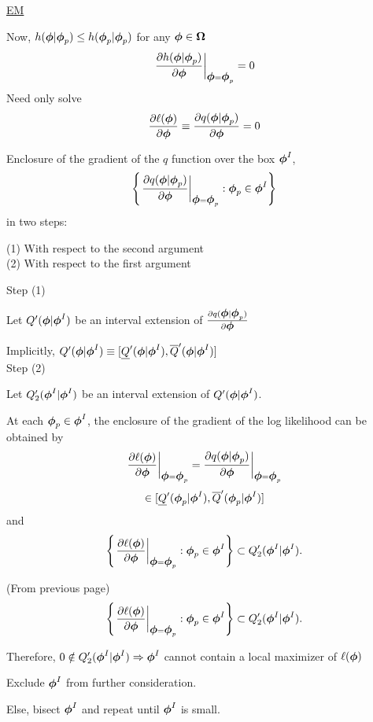 \documentclass{slides}
\begin{document}
\begin{slide}
\begin{center}\underline{EM}\end{center}
Now, $h(\bfphi | \bfphi_p) \leq h(\bfphi_p | \bfphi_p)$ for 
any $\bfphi \in \bfOmega$
$$\left.\frac{\partial h(\bfphi | \bfphi_p)}{\partial \bfphi}
  \right|_{\bfphi=\bfphi_p}=0$$
Need only solve
$$ 
\frac{\partial \ell(\bfphi)}{\partial \bfphi} \equiv 
\frac{\partial q(\bfphi | \bfphi_p)}{\partial \bfphi} = 0
$$

Enclosure of the gradient of the $q$ function over the box $\bfphi^I$,
$$
\left\{ \left.\frac{\partial q(\bfphi | \bfphi_p)}{\partial\bfphi} 
  \right|_{\bfphi=\bfphi_p} : \bfphi_p \in \bfphi^I \right\}
$$
in two steps:

(1) With respect to the second argument\\
(2) With respect to the first argument\\
\end{slide}
\begin{slide}
Step (1)

Let $Q'(\bfphi | \bfphi^I)$
be an interval extension of 
$\frac{\partial q(\bfphi|\bfphi_p)}{\partial\bfphi} $

Implicitly, $Q'(\bfphi | \bfphi^I) \equiv [\underline{Q}'(\bfphi | \bfphi^I), \overline{Q}'(\bfphi | \bfphi^I)]$\\

Step (2)

Let $Q'_2(\bfphi^I | \bfphi^I)$ be an interval extension of
$Q'(\bfphi | \bfphi^I)$.

At each $\bfphi_p \in \bfphi^I$, the enclosure of the gradient of the
log likelihood can be obtained by 
$$
\frac{\partial \ell(\bfphi)}{\partial \bfphi} \bigg| _{\bfphi=\bfphi_p} 
= \frac{\partial q(\bfphi|\bfphi_p)}{\partial \bfphi} \bigg|
_{\bfphi=\bfphi_p}$$  
$$\in
[\underline{Q}'(\bfphi_p | \bfphi^I), \overline{Q}'(\bfphi_p | \bfphi^I)]
$$
and
$$
\left\{ \left. \frac{\partial\ell(\bfphi)}{\partial\bfphi} 
  \right|_{\bfphi = \bfphi_p} : \bfphi_p \in \bfphi^I \right\}
\subset Q'_2(\bfphi^I | \bfphi^I).
$$
\end{slide}
\begin{slide}
(From previous page)
$$
\left\{ \left. \frac{\partial\ell(\bfphi)}{\partial\bfphi} 
  \right|_{\bfphi = \bfphi_p} : \bfphi_p \in \bfphi^I \right\}
\subset Q'_2(\bfphi^I | \bfphi^I).
$$

Therefore, $0 \notin Q'_2(\bfphi^I | \bfphi^I) 
  \Rightarrow \bfphi^I$ cannot contain a local maximizer of $\ell(\bfphi)$ 

Exclude $\bfphi^I$ from further consideration.

Else, bisect $\bfphi^I$ and repeat until $\bfphi^I$ is small.
\end{slide}
\end{document}

